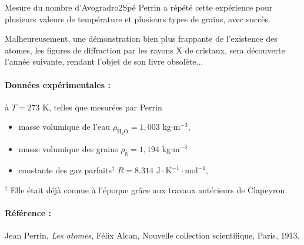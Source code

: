 \begin{exercise}{Mesure du nombre d'Avogradro}{2}{Spé}
\plusloin
Perrin a répété cette expérience pour plusieurs valeurs de température et plusieurs types de grains, avec succès.

Malheureusement, une démonstration bien plus frappante de l'existence des atomes, les figures de diffraction par les rayons X de cristaux, sera découverte l'année suivante, rendant l'objet de son livre obsolète... 

\paragraph{Données expérimentales : } à $T = 273$ K, telles que mesurées par Perrin
\begin{itemize}
    \item masse volumique de l'eau $\rho_\mathrm{H_2O} = 1,003$ kg$\cdot$m$^{-3}$,
    \item masse volumique des grains $\rho_\text{g} = 1,194$ kg$\cdot$m$^{-3}$
    \item constante des gaz parfaits$^\dagger$ $R = 8.314$ $\mathrm{J\cdot K^{-1}\cdot mol^{-1}}$,
\end{itemize}
\medskip
$^\dagger$ \small{Elle était déjà connue à l'époque grâce aux travaux antérieurs de Clapeyron.}

\paragraph{Référence :} Jean Perrin, \emph{Les atomes}, Félix Alcan, Nouvelle collection scientifique, Paris, 1913.
\end{exercise}